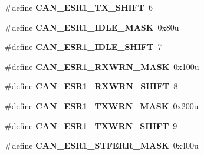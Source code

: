 \begin{DoxyCompactItemize}
\item 
\hypertarget{group___c_a_n___register___masks_ga054c570f7af7ef5b09d3d5f5b3edaa3e}{}\#define {\bfseries C\+A\+N\+\_\+\+E\+S\+R1\+\_\+\+T\+X\+\_\+\+S\+H\+I\+F\+T}~6\label{group___c_a_n___register___masks_ga054c570f7af7ef5b09d3d5f5b3edaa3e}

\item 
\hypertarget{group___c_a_n___register___masks_ga68402932c750edd9ad719585c3be03d2}{}\#define {\bfseries C\+A\+N\+\_\+\+E\+S\+R1\+\_\+\+I\+D\+L\+E\+\_\+\+M\+A\+S\+K}~0x80u\label{group___c_a_n___register___masks_ga68402932c750edd9ad719585c3be03d2}

\item 
\hypertarget{group___c_a_n___register___masks_ga1eccf60cd0f2bf9a3a426f1ff05f8869}{}\#define {\bfseries C\+A\+N\+\_\+\+E\+S\+R1\+\_\+\+I\+D\+L\+E\+\_\+\+S\+H\+I\+F\+T}~7\label{group___c_a_n___register___masks_ga1eccf60cd0f2bf9a3a426f1ff05f8869}

\item 
\hypertarget{group___c_a_n___register___masks_ga805a12fba10c76a26fddedeb8634bbe6}{}\#define {\bfseries C\+A\+N\+\_\+\+E\+S\+R1\+\_\+\+R\+X\+W\+R\+N\+\_\+\+M\+A\+S\+K}~0x100u\label{group___c_a_n___register___masks_ga805a12fba10c76a26fddedeb8634bbe6}

\item 
\hypertarget{group___c_a_n___register___masks_ga879a6ef8506f66a73cfc185d6814ee4e}{}\#define {\bfseries C\+A\+N\+\_\+\+E\+S\+R1\+\_\+\+R\+X\+W\+R\+N\+\_\+\+S\+H\+I\+F\+T}~8\label{group___c_a_n___register___masks_ga879a6ef8506f66a73cfc185d6814ee4e}

\item 
\hypertarget{group___c_a_n___register___masks_ga62d716c6701375e3106853152e62a312}{}\#define {\bfseries C\+A\+N\+\_\+\+E\+S\+R1\+\_\+\+T\+X\+W\+R\+N\+\_\+\+M\+A\+S\+K}~0x200u\label{group___c_a_n___register___masks_ga62d716c6701375e3106853152e62a312}

\item 
\hypertarget{group___c_a_n___register___masks_ga62114b41b2b2c5fb95cedde48d06d361}{}\#define {\bfseries C\+A\+N\+\_\+\+E\+S\+R1\+\_\+\+T\+X\+W\+R\+N\+\_\+\+S\+H\+I\+F\+T}~9\label{group___c_a_n___register___masks_ga62114b41b2b2c5fb95cedde48d06d361}

\item 
\hypertarget{group___c_a_n___register___masks_ga8af394ab6bb4356bc5fa71e2278332ad}{}\#define {\bfseries C\+A\+N\+\_\+\+E\+S\+R1\+\_\+\+S\+T\+F\+E\+R\+R\+\_\+\+M\+A\+S\+K}~0x400u\label{group___c_a_n___register___masks_ga8af394ab6bb4356bc5fa71e2278332ad}


\end{DoxyCompactItemize}
